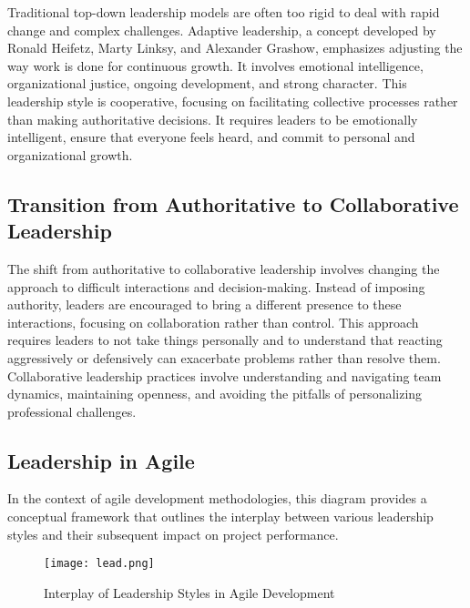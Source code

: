 \documentclass[runningheads]{llncs}
\begin{document}
Traditional top-down leadership models are often too rigid to deal with rapid change and complex challenges. Adaptive leadership, a concept developed by Ronald Heifetz, Marty Linksy, and Alexander Grashow, emphasizes adjusting the way work is done for continuous growth. It involves emotional intelligence, organizational justice, ongoing development, and strong character. This leadership style is cooperative, focusing on facilitating collective processes rather than making authoritative decisions. It requires leaders to be emotionally intelligent, ensure that everyone feels heard, and commit to personal and organizational growth. \cite{ref_23}\cite{ref_7}

\subsection{Transition from Authoritative to Collaborative Leadership}

The shift from authoritative to collaborative leadership involves changing the approach to difficult interactions and decision-making. Instead of imposing authority, leaders are encouraged to bring a different presence to these interactions, focusing on collaboration rather than control. This approach requires leaders to not take things personally and to understand that reacting aggressively or defensively can exacerbate problems rather than resolve them. Collaborative leadership practices involve understanding and navigating team dynamics, maintaining openness, and avoiding the pitfalls of personalizing professional challenges. \cite{ref_21}\cite{ref_7}


\subsection{Leadership in Agile}

In the context of agile development methodologies, this diagram provides a conceptual framework that outlines the interplay between various leadership styles and their subsequent impact on project performance. \cite{ref_8}\cite{ref_25}

\begin{figure}[ht]
\centering
\texttt{[image: lead.png]}
\caption{Interplay of Leadership Styles in Agile Development}
\label{fig:leadershipstyles}
\end{figure}
\end{document}
